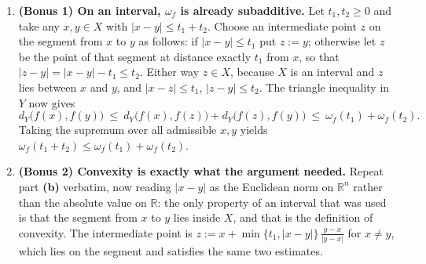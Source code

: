 \begin{exercisesolution}
\begin{enumerate}[label=\textbf{(\alph*)}]
    \textbf{($\Rightarrow$) Uniform continuity produces one.} Following the official hint, define
    the  as its worst oscillation at scale $t$:
    \[\omega_f(t) := \sup\big\{\,d_Y(f(x),f(y))\ :\ x,y \in X,\ d_X(x,y) \leq t\,\big\}
      \ \in\ [0,\infty].\]
    It has all three required properties. $\omega_f(0) = 0$, because $d_X(x,y) \leq 0$ forces
    $x=y$ by definiteness and then $d_Y(f(x),f(y)) = 0$. It is nondecreasing, because enlarging
    $t$ enlarges the set over which the supremum is taken. And $\omega_f(t) \to 0$ as
    $t \downarrow 0$: given $\varepsilon > 0$, uniform continuity supplies $\delta > 0$ with
    $d_X(x,y) < \delta \Rightarrow d_Y(f(x),f(y)) < \varepsilon$, so every $t < \delta$ has
    $\omega_f(t) \leq \varepsilon$. Finally $f$ has modulus $\omega_f$ by construction, since
    $d_Y(f(x),f(y))$ is one of the numbers the supremum defining $\omega_f(d_X(x,y))$ ranges
    over.
  \item \textbf{(Bonus 1) On an interval, $\omega_f$ is already subadditive.} Let
    $t_1,t_2 \geq 0$ and take any $x,y \in X$ with $|x-y| \leq t_1+t_2$. Choose an intermediate
    point $z$ on the segment from $x$ to $y$ as follows: if $|x-y| \leq t_1$ put $z := y$;
    otherwise let $z$ be the point of that segment at distance exactly $t_1$ from $x$, so that
    $|z-y| = |x-y| - t_1 \leq t_2$. Either way $z \in X$, because $X$ is an interval and $z$ lies
    between $x$ and $y$, and $|x-z| \leq t_1$, $|z-y| \leq t_2$. The triangle inequality in $Y$
    now gives
    \[d_Y\big(f(x),f(y)\big) \ \leq\ d_Y\big(f(x),f(z)\big) + d_Y\big(f(z),f(y)\big)
      \ \leq\ \omega_f(t_1) + \omega_f(t_2).\]
    Taking the supremum over all admissible $x,y$ yields
    $\omega_f(t_1+t_2) \leq \omega_f(t_1) + \omega_f(t_2)$.
  \item \textbf{(Bonus 2) Convexity is exactly what the argument needed.} Repeat part \textbf{(b)}
    verbatim, now reading $|x-y|$ as the Euclidean norm on $\mathbb{R}^n$ rather than the absolute
    value on $\mathbb{R}$: the only property of an interval that was used is that the segment from
    $x$ to $y$ lies inside $X$, and that is the definition of convexity. The intermediate point is
    $z := x + \min\{t_1,|x-y|\}\,\frac{y-x}{|y-x|}$ for $x \neq y$, which lies on the segment and
    satisfies the same two estimates.
\end{enumerate}


\end{exercisesolution}

